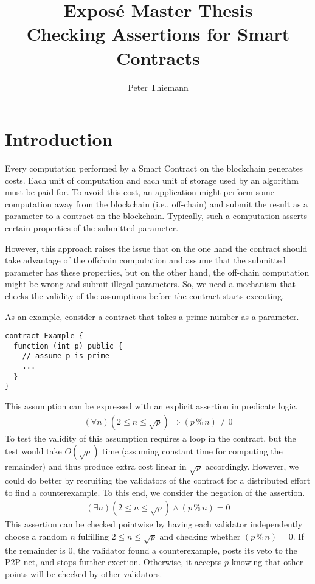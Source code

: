 \documentclass{article}
\title{Expos\'{e} Master Thesis\\
  Checking Assertions for Smart Contracts}
\author{Peter Thiemann}
\begin{document}
\maketitle{}

\section{Introduction}
\label{sec:introduction}

Every computation performed by a Smart Contract on the blockchain generates costs. Each
unit of computation and each unit of storage used by an algorithm must be paid for. To
avoid this cost, an application might perform some computation away from the blockchain
(i.e., off-chain) and submit the result as a parameter to a contract on the
blockchain. Typically, such a computation asserts certain properties of the 
submitted parameter. 

However, this approach raises the issue that on the one hand the contract should take
advantage of the offchain computation and assume that the submitted parameter has
these properties, but on the other hand, the off-chain computation might be wrong and
submit illegal parameters. So, we need a mechanism that checks the validity of the
assumptions before the contract starts executing.

As an example, consider a contract that takes a prime number as a parameter.
\begin{lstlisting}[numbers=none]
contract Example {
  function (int p) public {
    // assume p is prime
    ...
  }
}
\end{lstlisting}
This assumption can be expressed with an explicit assertion in predicate logic.
\begin{gather}\label{eq:5}
  (\forall n) (2 \le n \le \sqrt p) \Rightarrow (p \mathbin{\%} n) \ne 0
\end{gather}
To test the validity of this assumption requires a loop in the contract, but the test would take
$O(\sqrt p)$ time (assuming constant time for computing the remainder) and thus produce extra cost
linear in $\sqrt p$ accordingly. 
However, we could do better by recruiting the validators of the contract for a distributed
effort to find a counterexample. To this end, we consider the negation of the assertion.
\begin{gather}\label{eq:4}
  (\exists n) (2 \le n \le \sqrt p) \wedge (p \mathbin{\%} n) = 0
\end{gather}
This assertion can be checked pointwise by having each validator independently choose a
random $n$ fulfilling $2 \le n \le 
\sqrt p$ and checking whether $(p \mathbin{\%} n) = 0$. If the remainder is $0$, the
validator found a counterexample, posts its veto to the P2P net, and stops further
exection. Otherwise, it accepts $p$ knowing that other points will be checked by other
validators.
\end{document}
